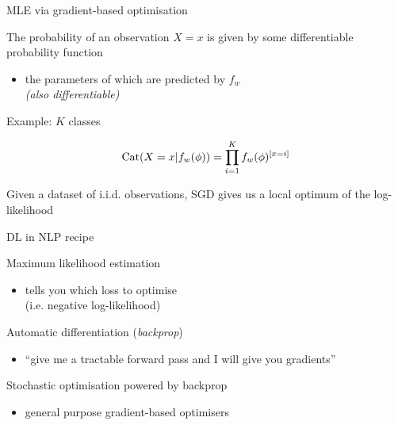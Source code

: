 \documentclass[14pt]{beamer}
\begin{document}
\begin{frame}{MLE via gradient-based optimisation}

The probability of an observation $X=x$ is given by some \alert{differentiable} probability function
\begin{itemize}
	\item the parameters of which are predicted by $f_w$\\
	\emph{(also differentiable)}
\end{itemize}

Example: $K$ classes
\begin{small}
\begin{equation*}
\operatorname{Cat}(X=x|f_w(\phi)) = \prod_{i=1}^K f_w(\phi)^{[x=i]} 
\end{equation*}
\end{small}

Given a dataset of i.i.d. observations, SGD gives us a local optimum of the log-likelihood %


\end{frame}



\begin{frame}{DL in NLP recipe}



	Maximum likelihood estimation
	\begin{itemize}
		\item  tells you which \alert{loss} to optimise \\
		(i.e. negative log-likelihood)
	\end{itemize}
	
	Automatic differentiation (\emph{backprop})
	\begin{itemize}
		\item ``give me a tractable forward pass and I will give you \alert{gradients}''
	\end{itemize}
	
	Stochastic optimisation powered by backprop
	\begin{itemize}
		\item general purpose gradient-based optimisers
	\end{itemize}

\end{frame}
\end{document}
